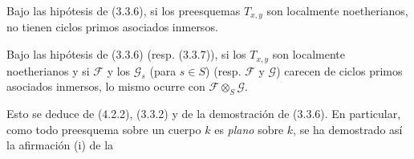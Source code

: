 \begin{corollary}[4.2.2]
\label{IV.2.4.2.2-fr}
Bajo las hipótesis de \textup{(3.3.6)}, si los preesquemas $T_{x,y}$ son localmente
noetherianos, no tienen ciclos primos asociados inmersos.
\end{corollary}

\begin{corollary}[4.2.3]
\label{IV.2.4.2.3-fr}
Bajo las hipótesis de \textup{(3.3.6) (resp. (3.3.7))}, si los $T_{x,y}$ son
localmente noetherianos y si $\mathcal F$ y los $\mathcal G_s$ \textup{(}para $s\in S$\textup{)}
\textup{(resp.} $\mathcal F$ y $\mathcal G$\textup{)} carecen de ciclos primos asociados
inmersos, lo mismo ocurre con $\mathcal F\otimes_S\mathcal G$.
\end{corollary}

Esto se deduce de (4.2.2), (3.3.2) y de la demostración de (3.3.6). En
particular, como todo preesquema sobre un cuerpo $k$ es \emph{plano} sobre $k$,
se ha demostrado así la afirmación (i) de la
